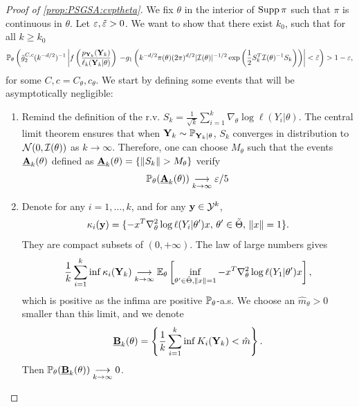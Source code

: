 \begin{proof}[Proof of \cref{prop:PSGSA:cvptheta}]
    We fix $\theta$ in the interior of $\operatorname{Supp}\pi$ such that $\pi$ is continuous in $\theta$. Let $\varepsilon,\tilde{\varepsilon}>0$. We want to show that there exist $k_0$, such that for all $k\geq k_0$
        \begin{equation}
            \mathbb{P}_\theta\left(\tilde g_2^{C,c}(k^{-d/2})^{-1}\left| f\left(\frac{p_{\mathbf{Y}_k}(\mathbf{Y}_k)}{\ell_k(\mathbf{Y}_k|\theta)}\right) \right.            \left. - g_1\left(k^{-d/2}\pi(\theta)(2\pi)^{d/2}|\mathcal{I}(\theta)|^{-1/2}\exp\left(\frac{1}{2}S_k^T\mathcal{I}(\theta)^{-1}S_k \right)\right) \right|<\tilde{\varepsilon}   \right)>1-\varepsilon,
        \end{equation}
    for some $C,c = C_\theta,c_\theta$.
    We start by defining some events that 
    will be asymptotically negligible:
    \begin{enumerate}
    \item Remind the definition of the r.v. $S_k=\frac{1}{\sqrt{k}}\sum_{i=1}^k\nabla_\theta\log\ell(Y_i|\theta)$. The central limit theorem ensures that when $\mathbf{Y}_k\sim\mathbb{P}_{\mathbf{Y}_k|\theta}$, $S_k$ converges in distribution to $\mathcal{N}(0,\mathcal{I}(\theta))$ as $k\to\infty$. Therefore, one can choose $M_\theta$ such that the events $ \underline{\mathbf{A}}_k(\theta)$ defined as $ \underline{\mbf A}_k(\theta)=\{\|S_k\|>M_\theta\}$ verify
        \begin{equation}
            \mathbb{P}_\theta( \underline{\mathbf{A}}_k(\theta))\overset{\ }{\underset{k\rightarrow\infty}{\longrightarrow}}\varepsilon/5
        \end{equation}
    
        \item Denote for any $i=1,\dots,k$, and for any $\mathbf{y} \in\mathcal{Y}^k$,
        \begin{equation}
            \kappa_i(\mathbf{y})=\{-x^T\nabla^2_\theta\log\ell(Y_i|\theta')x,\,\theta'\in\tilde\Theta,\,\|x\|=1\}.
        \end{equation}
     They are compact subsets of $(0,+\infty)$. The law of large numbers gives 
     \begin{equation}
        \frac{1}{k}\sum_{i=1}^k\inf \kappa_i(\mathbf{Y}_k)\overset{\ }{\underset{k\rightarrow\infty}{\longrightarrow}}\mathbb{E}_\theta\left[\inf_{\theta'\in\tilde\Theta,\|x\|=1}-x^T\nabla^2_\theta\log\ell(Y_1|\theta')x\right]  ,
     \end{equation}
    which is positive as the infima are positive $\mathbb{P}_\theta$-a.s. We choose an $\hat m_\theta>0$ smaller than this limit, and we denote
        \begin{equation}
             \underline{\mathbf{B}}_k(\theta)=\left\{\frac{1}{k}\sum_{i=1}^k\inf K_i(\mathbf{Y}_k)<\hat m\right\}.       
        \end{equation}
     Then $\mathbb{P}_\theta( \underline{\mathbf{B}}_k(\theta))\overset{\ }{\underset{k\rightarrow\infty}{\longrightarrow}}0$.


\end{enumerate}
\end{proof}
